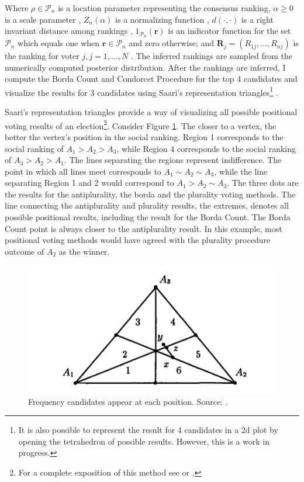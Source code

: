 \documentclass[hidelinks,11pt]{article}
\begin{document}
Where $\rho \in \mathcal{P}_{n}$ is a location parameter representing the consensus ranking, $\alpha \geq 0$ is a scale parameter , $Z_{n}(\alpha)$ is a normalizing function , $d(\cdot, \cdot)$ is a right invariant distance among rankings ,  $1_{\mathcal{P}_{n}}(\mathbf{r})$ is an indicator function for the set $\mathcal{P}_{n}$ which equals one when $\mathbf{r} \in \mathcal{P}_{n}$ and zero otherwise; and $\mathbf{R}_{j}=\left(R_{1 j}, \ldots, R_{n j}\right)$ is the ranking for voter $j, j=1, \ldots, N$ \parencite{sorensen2019bayesmallows}. The inferred rankings are sampled from the numerically computed posterior
distribution. After the rankings are inferred, I compute the Borda Count and Condorcet Procedure for the top
4 candidates and visualize the results for 3 candidates using Saari's representation triangles\footnote{It is also possible to represent the result for 4 candidates in a 2d plot by opening the tetrahedron of possible results\parencite{saari2001chaotic}. However, this is a work in progress.} \parencite{saari2012geometry}.

Saari's representation triangles provide a way of visualizing all possible
positional voting results of an election\footnote{For a complete exposition of
  this method see \textcite{saari1995basic} or \textcite{nurmi2002voting}.}. Consider Figure \ref{fig:saari_nurmi}. The closer to a vertex, the better the vertex's position in the social ranking. Region 1 corresponds to the social ranking of \(A_{1} > A_{2} > A_{3}\), while Region 4 corresponds to the social ranking of \(A_{3}>A_{2}>A_{1}\). The lines separating the regions represent indifference. The point in which all lines meet corresponds to \(A_{1} \sim A_{2} \sim A_{3}\), while the line separating Region 1 and 2 would correspond to \(A_{1} > A_{2} \sim A_{3}\). The three dots are the results for the antiplurality, the borda and the plurality voting methods. The line connecting the antiplurality and plurality results, the extremes, denotes all possible positional results, including the result for the Borda Count. The Borda Count point is always closer to the antiplurality result. In this example, most positional voting methods would have agreed with the plurality procedure outcome of \(A_{2}\) as the winner.

\begin{figure}[H]
 \centering
 \includegraphics[width=\columnwidth,
 height=0.3\textheight]{./images/saari_triangle.png}
 \caption{Frequency candidates appear at each position. Source: \textcite{nurmi2002voting}.}
 \label{fig:saari_nurmi}
\end{figure}
\end{document}
